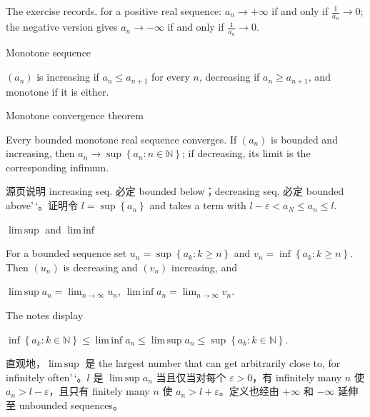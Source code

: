The exercise records, for a positive real sequence: \(a_{n}\rightarrow + \infty\) if and only if \(\frac{1}{a_{n}}\rightarrow 0\); the negative version gives \(a_{n}\rightarrow - \infty\) if and only if \(\frac{1}{a_{n}}\rightarrow 0\).

\begin{definition}{Monotone sequence}

\(\left( a_{n} \right)\) is increasing if \(a_{n} \leq a_{n + 1}\) for every \(n\), decreasing if \(a_{n} \geq a_{n + 1}\), and monotone if it is either.

\end{definition}

\begin{theorem}{Monotone convergence theorem}

Every bounded monotone real sequence converges. If \(\left( a_{n} \right)\) is bounded and increasing, then \(a_{n}\rightarrow\sup\left\{ {a_{n}:n \in \mathbb{N}} \right\}\); if decreasing, its limit is the corresponding infimum.

\end{theorem}

源页说明 increasing seq. 必定 bounded below；decreasing seq. 必定 bounded above'\,`。证明令 \(l = \sup\left\{ a_{n} \right\}\) and takes a term with \(l - \varepsilon < a_{N} \leq a_{n} \leq l\).

\begin{definition}{\(\operatorname{lim\, sup}\) and \(\operatorname{lim\, inf}\)}

For a bounded sequence set \(u_{n} = \sup\left\{ {a_{k}:k \geq n} \right\}\) and \(v_{n} = \inf\left\{ {a_{k}:k \geq n} \right\}\). Then \(\left( u_{n} \right)\) is decreasing and \(\left( v_{n} \right)\) increasing, and

\(\operatorname{lim\, sup}a_{n} = \lim_{n\rightarrow\infty}u_{n}\), \(\operatorname{lim\, inf}a_{n} = \lim_{n\rightarrow\infty}v_{n}\).

\end{definition}

The notes display

\(\inf\left\{ {a_{k}:k \in \mathbb{N}} \right\} \leq \operatorname{lim\, inf}a_{n} \leq \operatorname{lim\, sup}a_{n} \leq \sup\left\{ {a_{k}:k \in \mathbb{N}} \right\}\).

直观地，\(\operatorname{lim\, sup}\) 是 the largest number that can get arbitrarily close to, for infinitely often'\,`。\(l\) 是 \(\operatorname{lim\, sup}a_{n}\) 当且仅当对每个 \(\varepsilon > 0\)，有 infinitely many \(n\) 使 \(a_{n} > l - \varepsilon\)，且只有 finitely many \(n\) 使 \(a_{n} > l + \varepsilon\)。定义也经由 \(+ \infty\) 和 \(- \infty\) 延伸至 unbounded sequences。

